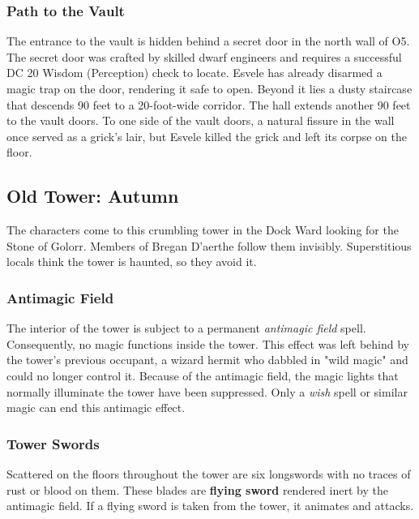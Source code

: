\documentclass[10pt,a4paper,twoside,twocolumn,openany,nodeprecatedcode]{dndbook}
\begin{document}
\subsubsection{Path to the Vault}
The entrance to the vault is hidden behind a secret door in the north wall of O5. The secret door was crafted by skilled dwarf engineers and requires a successful DC 20 Wisdom (Perception) check to locate. Esvele has already disarmed a magic trap on the door, rendering it safe to open. Beyond it lies a dusty staircase that descends 90 feet to a 20-foot-wide corridor. The hall extends another 90 feet to the vault doors. To one side of the vault doors, a natural fissure in the wall once served as a grick's lair, but Esvele killed the grick and left its corpse on the floor.
\subsection{Old Tower: Autumn}
The characters come to this crumbling tower in the Dock Ward looking for the Stone of Golorr. Members of Bregan D'aerthe follow them invisibly. Superstitious locals think the tower is haunted, so they avoid it.
\subsubsection{Antimagic Field}
The interior of the tower is subject to a permanent \textit{antimagic field} spell. Consequently, no magic functions inside the tower. This effect was left behind by the tower's previous occupant, a wizard hermit who dabbled in "wild magic" and could no longer control it. Because of the antimagic field, the magic lights that normally illuminate the tower have been suppressed. Only a \textit{wish} spell or similar magic can end this antimagic effect.
\subsubsection{Tower Swords}
Scattered on the floors throughout the tower are six longswords with no traces of rust or blood on them. These blades are \textbf{flying sword} rendered inert by the antimagic field. If a flying sword is taken from the tower, it animates and attacks.
\end{document}
